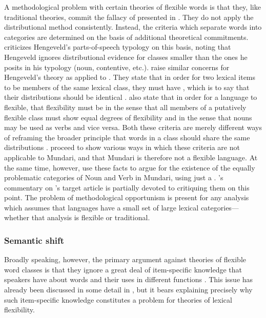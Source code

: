 A methodological problem with certain theories of flexible words is that they, like traditional theories, commit the fallacy of  \parencite[30, 41]{Croft2001b} presented in . They do not apply the distributional method consistently. Instead, the criteria which separate words into categories are determined on the basis of additional theoretical commitments. \textcite[§2.2.2]{Croft2001b} criticizes Hengeveld's parts-of-speech typology on this basis, noting that Hengeveld ignores distributional evidence for classes smaller than the ones he posits in his typology (noun, contentive, etc.). \textcite{EvansOsada2005} raise similar concerns for Hengeveld's theory as applied to . They state that in order for two lexical items to be members of the same lexical class, they must have , which is to say that their distributions should be identical \parencite[366]{EvansOsada2005}. \citeauthor{EvansOsada2005} also state that in order for a language to flexible, that flexibility must be  in the sense that all members of a putatively flexible class must show equal degrees of flexibility and  in the sense that nouns may be used as verbs and vice versa. Both these criteria are merely different ways of reframing the broader principle that words in a class should share the same distributions \parencite[434]{Croft2005}. \citeauthor{EvansOsada2005} proceed to show various ways in which these criteria are not applicable to Mundari, and that Mundari is therefore not a flexible language. At the same time, however, \citeauthor{EvansOsada2005} use these facts to argue for the existence of the equally problematic categories of Noun and Verb in Mundari, using just a . \citeauthor{Croft2005}'s \parencite*{Croft2005} commentary on \citeauthor{EvansOsada2005}'s target article is partially devoted to critiquing them on this point. The problem of methodological opportunism is present for any analysis which assumes that languages have a small set of large lexical categories—whether that analysis is flexible or traditional.

\subsubsection{Semantic shift}
\label{sec:2.3.3.2}

Broadly speaking, however, the primary argument against theories of flexible word classes is that they ignore a great deal of item-specific knowledge that speakers have about words and their uses in different functions \parencites[§3.2]{EvansOsada2005}[216]{Beck2013}. This issue has already been discussed in some detail in , but it bears explaining precisely why such item-specific knowledge constitutes a problem for theories of lexical flexibility.

